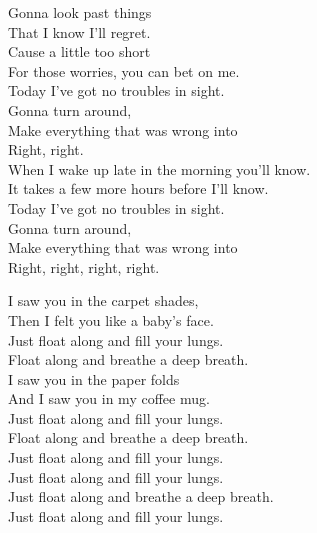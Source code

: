 Gonna look past things \\
That I know I'll regret. \\
Cause  a little too short \\
For those worries, you can bet on me. \\
Today I've got no troubles in sight. \\
Gonna turn around, \\
Make everything that was wrong into \\
Right, right. \\

When I wake up late in the morning you'll know. \\
It takes a few more hours before I'll know. \\
Today I've got no troubles in sight. \\
Gonna turn around, \\
Make everything that was wrong into \\
Right, right, right, right. \\





I saw you in the carpet shades, \\
Then I felt you like a baby's face. \\
Just float along and fill your lungs. \\
Float along and breathe a deep breath. \\

I saw you in the paper folds \\
And I saw you in my coffee mug. \\
Just float along and fill your lungs. \\
Float along and breathe a deep breath. \\

Just float along and fill your lungs. \\
Just float along and fill your lungs. \\
Just float along and breathe a deep breath. \\
Just float along and fill your lungs. \\
